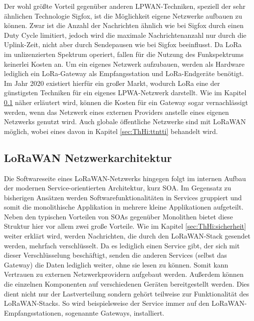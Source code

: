 Der wohl größte Vorteil gegenüber anderen LPWAN-Techniken, speziell der sehr ähnlichen Technologie Sigfox, ist die Möglichkeit eigene Netzwerke aufbauen zu können. Zwar ist die Anzahl der Nachrichten ähnlich wie bei Sigfox durch einen Duty Cycle limitiert, jedoch wird die maximale Nachrichtenanzahl nur durch die Uplink-Zeit, nicht aber durch Sendepausen wie bei Sigfox beeinflusst. Da LoRa im unlizen\-zierten Spektrum operiert, fallen für die Nutzung des Funkspektrums keinerlei Kosten an. Um ein eigenes Netzwerk aufzubauen, werden als Hardware lediglich ein LoRa-Gateway als Empfangsstation und LoRa-Endgeräte benötigt. Im Jahr 2020 existiert hierfür ein großer Markt, wodurch LoRa eine der günstigsten Techniken für ein eigenes LPWA-Netzwerk darstellt. Wie im Kapitel \ref{sec:ThHi:architektur} näher erläutert wird, können die Kosten für ein Gateway sogar vernachlässigt werden, wenn das Netzwerk eines externen Providers anstelle eines eigenen Netzwerks genutzt wird. Auch glo\-bale öffentliche Netzwerke sind mit LoRaWAN möglich, wobei eines davon in Kapitel \ref{sec:ThHi:ttntti} behandelt wird.


\subsection{LoRaWAN Netzwerkarchitektur} %
\label{sec:ThHi:architektur}

Die Softwareseite eines LoRaWAN-Netzwerks hingegen folgt im internen Aufbau der modernen Service-orientierten Architektur, kurz SOA. Im Gegensatz zu bis\-herigen Ansätzen werden Softwarefunktionalitäten in Services gruppiert und somit die mono\-lithische Applikation in mehrere kleine Applikationen aufgeteilt. Neben den typischen Vorteilen von SOAs gegenüber Monolithen bietet diese Struktur hier vor allem zwei große Vorteile. Wie im Kapitel \ref{sec:ThHi:sicherheit} weiter erklärt wird, werden Nachrichten, die durch den LoRaWAN-Stack gesendet werden, mehrfach verschlüsselt. Da es lediglich einen Service gibt, der sich mit dieser Verschlüsselung beschäftigt, senden die anderen Services (selbst das Gateway) die Daten lediglich weiter, ohne sie lesen zu können. Somit kann Vertrauen zu externen Netzwerkprovidern aufgebaut werden. Außerdem können die einzelnen Komponenten auf verschiedenen Geräten bereitgestellt werden. Dies dient nicht nur der Lastverteilung sondern gehört teilweise zur Funktionalität des LoRaWAN-Stacks. So wird beispielsweise der Service  immer auf den LoRaWAN-Empfangsstationen, sogenannte Gateways, installiert.

